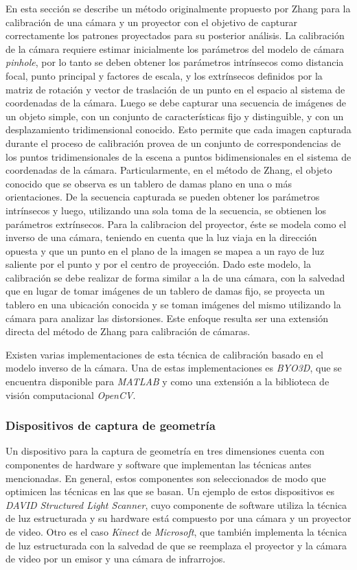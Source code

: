 En esta sección se describe un método originalmente propuesto por Zhang\cite{ZhangS} para la calibración de una cámara y un proyector con el objetivo de capturar correctamente los patrones proyectados para su posterior análisis.
La calibración de la cámara requiere estimar inicialmente los parámetros del modelo de cámara \emph{pinhole}, por lo tanto se deben obtener los parámetros intrínsecos como distancia focal, punto principal y factores de escala, y los extrínsecos definidos por la matriz de rotación y vector de traslación de un punto en el espacio al sistema de coordenadas de la cámara.
Luego se debe capturar una secuencia de imágenes de un objeto simple, con un conjunto de características fijo y distinguible, y con un desplazamiento tridimensional conocido. Esto permite que cada imagen capturada durante el proceso de calibración provea de un conjunto de correspondencias de los puntos tridimensionales de la escena a puntos bidimensionales en el sistema de coordenadas de la cámara. Particularmente, en el método de Zhang, el objeto conocido que se observa es un tablero de damas plano en una o más orientaciones. De la secuencia capturada se pueden obtener los parámetros intrínsecos y luego, utilizando una sola toma de la secuencia, se obtienen los parámetros extrínsecos.
Para la calibracion del proyector, éste se modela como el inverso de una cámara, teniendo en cuenta que la luz viaja en la dirección opuesta y que un punto en el plano de la imagen se mapea a un rayo de luz saliente por el punto y por el centro de proyección.
Dado este modelo, la calibración se debe realizar de forma similar a la de una cámara, con la salvedad que en lugar de tomar imágenes de un tablero de damas fijo, se proyecta un tablero en una ubicación conocida y se toman imágenes del mismo utilizando la cámara para analizar las distorsiones. Este enfoque resulta ser una extensión directa del método de Zhang para calibración de cámaras.

Existen varias implementaciones de esta técnica de calibración basado en el modelo inverso de la cámara. Una de estas implementaciones es \emph{BYO3D}\cite{BYO3D}, que se encuentra disponible para \emph{MATLAB}\cite{MATLAB} y como una extensión a la biblioteca de visión computacional \emph{OpenCV}\cite{OpenCV}.

\subsubsection{Dispositivos de captura de geometría}

Un dispositivo para la captura de geometría en tres dimensiones cuenta con componentes de hardware y software que implementan las técnicas antes mencionadas.
En general, estos componentes son seleccionados de modo que optimicen las técnicas en las que se basan.
Un ejemplo de estos dispositivos es \emph{DAVID Structured Light Scanner\cite{DAVID}}, cuyo componente de software utiliza la técnica de luz estructurada y su hardware está compuesto por una cámara y un proyector de video. Otro es el caso \emph{Kinect} de \emph{Microsoft}, que también implementa la técnica de luz estructurada con la salvedad de que se reemplaza el proyector y la cámara de video por un emisor y una cámara de infrarrojos.


